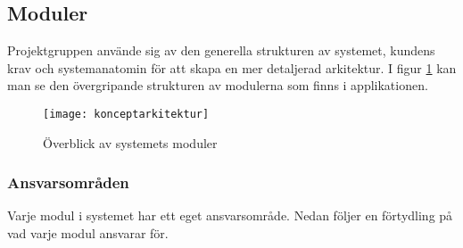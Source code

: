 \pagebreak

\subsection{Moduler}
Projektgruppen använde sig av den generella strukturen av systemet, kundens krav och systemanatomin för att skapa en mer detaljerad arkitektur. I figur \ref{fig:konceptarkitektur} kan man se den övergripande strukturen av modulerna som finns i applikationen.

\begin{figure}[h]
    \centering
    \texttt{[image: konceptarkitektur]}
    \caption{Överblick av systemets moduler}
    \label{fig:konceptarkitektur}
\end{figure}

\pagebreak


\subsubsection*{Ansvarsområden}
Varje modul i systemet har ett eget ansvarsområde. Nedan följer en förtydling på vad varje modul ansvarar för.

